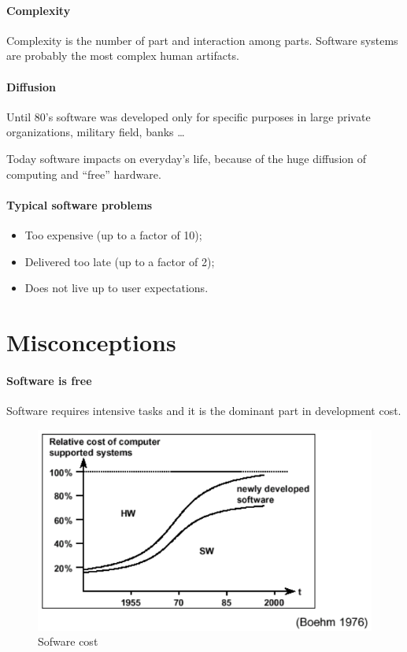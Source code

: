\paragraph{Complexity}
Complexity is the number of part and interaction among parts. Software systems are probably the most complex human artifacts.

\paragraph{Diffusion}
Until 80's software was developed only for specific purposes in large private organizations, military field, banks \dots

Today software impacts on everyday's life, because of the huge diffusion of computing and ``free'' hardware.

\paragraph{Typical software problems}
\begin{itemize}
\item Too expensive (up to a factor of 10);
\item Delivered too late (up to a factor of 2);
\item Does not live up to user expectations.
\end{itemize}

\section{Misconceptions}
\paragraph{Software is free} Software requires intensive tasks and it is the dominant part in development cost.

\begin{figure}[hbtp]
\centering
\includegraphics[scale=0.4]{images/software_cost.png}
\caption{Sofware cost}
\end{figure}

